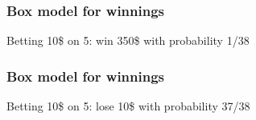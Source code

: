 \documentclass[handout]{beamer}
\begin{document}
   \begin{frame}
   \frametitle{Box model for winnings}
   \begin{center}
   \end{center}
   Betting 10\$ on {\color{red} 5}: win 350\$ with probability 1/38
   \end{frame}



   \begin{frame}
   \frametitle{Box model for winnings}
   \begin{center}
   \end{center}
   Betting 10\$ on {\color{red} 5}: lose 10\$ with probability 37/38
   \end{frame}

\end{document}

